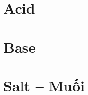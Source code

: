 \documentclass{article}
\begin{document}

\section{Acid}


\section{Base}


\section{Salt -- Muối}


\printbibliography[heading=bibintoc]
	
\end{document}

